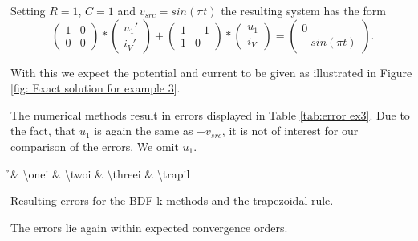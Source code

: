 \begin{example3}
	Setting $R=1$, $C=1$ and $v_{src} = sin(\pi t)$ the resulting system has the form
	\begin{displaymath}
			\begin{pmatrix}
			1 & 0 \\
			0 & 0 
		\end{pmatrix}
		*
		\begin{pmatrix}
			u_1' \\
			i_V'
		\end{pmatrix}
		+
		\begin{pmatrix}
			1 & -1 \\
			1 & 0
		\end{pmatrix}
		*
		\begin{pmatrix}
			u_1 \\
			i_V
		\end{pmatrix}
		=
		\begin{pmatrix}
			0 \\
			-sin(\pi t)
		\end{pmatrix}.
	\end{displaymath}
		
	With this we expect the potential and current to be given as illustrated in Figure \ref{fig: Exact solution for example 3}.

	The numerical methods result in errors displayed in Table \ref{tab:error ex3}. Due to the fact, that $u_1$ is again the same as $-v_{src}$, it is not of interest for our comparison of the errors. We omit $u_1$.
	
	\begin{table}[H]
			\centering
			{\h & \num{\onei} & \num{\twoi} & \num{\threei} & \num{\trapil}}
		\caption{Resulting errors for the BDF-k methods and the trapezoidal rule.}
		\label{tab:error ex3}
	\end{table}
	
	The errors lie again within expected convergence orders.
		
\end{example3}
	
